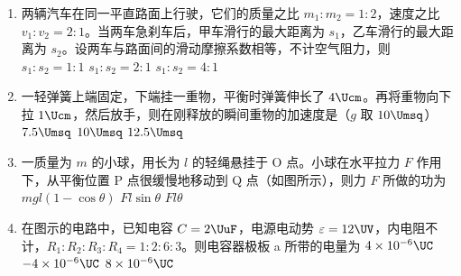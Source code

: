 \documentclass[\gkver]{gaokaozhenti}
\begin{document}
\begin{enumerate}
\item
两辆汽车在同一平直路面上行驶，它们的质量之比 $m_{1}:m_{2}=1:2$，速度之比 $v_{1}:v_{2}=2:1$。当两车急刹车后，甲车滑行的最大距离为 $s_{1}$，乙车滑行的最大距离为 $s_{2}$。设两车与路面间的滑动摩擦系数相等，不计空气阻力，则
{$s_{1}:s_{2}=1:1$}
{$s_{1}:s_{2}=2:1$}
{$s_{1}:s_{2}=4:1$}


\item
一轻弹簧上端固定，下端挂一重物，平衡时弹簧伸长了 $4\Ucm$。再将重物向下拉 $1\Ucm$，然后放手，则在刚释放的瞬间重物的加速度是（$g$ 取 $10\Umsq$）
\fourchoices[answer=A]
{$2.5\Umsq$}
{$7.5\Umsq$}
{$10\Umsq$}
{$12.5\Umsq$}


\item
一质量为 $m$ 的小球，用长为 $l$ 的轻绳悬挂于 O 点。小球在水平拉力 $F$ 作用下，从平衡位置 P 点很缓慢地移动到 Q 点（如图所示），则力 $F$ 所做的功为
\onepicture[w=3cm]{}
{$mgl(1-\cos\theta)$}
{$Fl\sin\theta$}
{$Fl\theta$}


\item
在图示的电路中，已知电容 $C=2\UuF$，电源电动势 $\varepsilon=12\UV$，内电阻不计，$R_{1}:R_{2}:R_{3}:R_{4}=1:2:6:3$。则电容器极板 a 所带的电量为
{$4\times10^{-6}\UC$}
{$-4\times10^{-6}\UC$}
{$8\times10^{-6}\UC$}


\end{enumerate}
\end{document}
